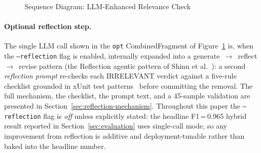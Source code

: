 \documentclass[acmlarge,nonacm,screen]{acmart}
\begin{document}
\begin{figure}[htbp]
\caption{Sequence Diagram: LLM-Enhanced Relevance Check}
\label{fig:sequence}
\end{figure}

\paragraph{Optional reflection step.} The single LLM call shown in
the \texttt{opt} CombinedFragment of Figure~\ref{fig:sequence} is,
when the \texttt{--reflection} flag is enabled, internally
expanded into a generate~$\to$~reflect~$\to$~revise pattern (the
Reflection agentic pattern of Shinn et al.~\cite{shinn2023reflexion}):
a second \emph{reflection prompt} re-checks each \textsc{IRRELEVANT}
verdict against a five-rule checklist grounded in xUnit test
patterns~\cite{meszaros2007xunit} before committing the removal.
The full mechanism, the checklist, the prompt text, and a
45-sample validation are presented in
Section~\ref{sec:reflection-mechanism}. Throughout this paper the
\texttt{--reflection} flag is \emph{off} unless explicitly stated:
the headline F1\,=\,0.965 hybrid result reported in
Section~\ref{sec:evaluation} uses single-call mode, so any
improvement from reflection is additive and deployment-tunable
rather than baked into the headline number.
\end{document}
